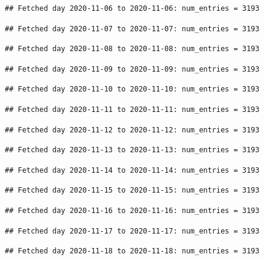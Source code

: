 \documentclass[]{article}
\begin{document}
\begin{verbatim}
## Fetched day 2020-11-06 to 2020-11-06: num_entries = 3193
\end{verbatim}

\begin{verbatim}
## Fetched day 2020-11-07 to 2020-11-07: num_entries = 3193
\end{verbatim}

\begin{verbatim}
## Fetched day 2020-11-08 to 2020-11-08: num_entries = 3193
\end{verbatim}

\begin{verbatim}
## Fetched day 2020-11-09 to 2020-11-09: num_entries = 3193
\end{verbatim}

\begin{verbatim}
## Fetched day 2020-11-10 to 2020-11-10: num_entries = 3193
\end{verbatim}

\begin{verbatim}
## Fetched day 2020-11-11 to 2020-11-11: num_entries = 3193
\end{verbatim}

\begin{verbatim}
## Fetched day 2020-11-12 to 2020-11-12: num_entries = 3193
\end{verbatim}

\begin{verbatim}
## Fetched day 2020-11-13 to 2020-11-13: num_entries = 3193
\end{verbatim}

\begin{verbatim}
## Fetched day 2020-11-14 to 2020-11-14: num_entries = 3193
\end{verbatim}

\begin{verbatim}
## Fetched day 2020-11-15 to 2020-11-15: num_entries = 3193
\end{verbatim}

\begin{verbatim}
## Fetched day 2020-11-16 to 2020-11-16: num_entries = 3193
\end{verbatim}

\begin{verbatim}
## Fetched day 2020-11-17 to 2020-11-17: num_entries = 3193
\end{verbatim}

\begin{verbatim}
## Fetched day 2020-11-18 to 2020-11-18: num_entries = 3193
\end{verbatim}
\end{document}
